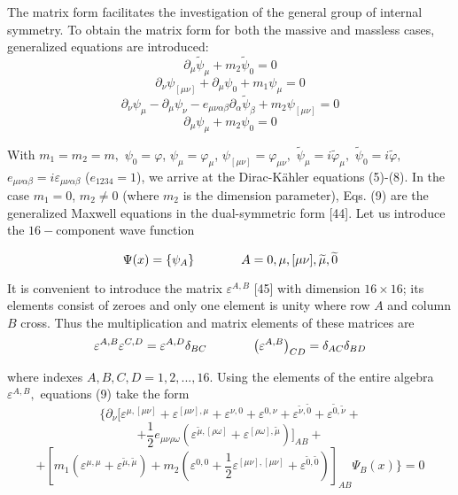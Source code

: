 \documentclass[a4paper,12pt]{article}
\begin{document}
The matrix form facilitates the investigation of the general group of
internal symmetry. To obtain the matrix form for both the massive and
massless cases, generalized equations are introduced:
\[
\partial _\mu \widetilde{\psi }_\mu +m_2\widetilde{\psi }_0=0
\]
\[
\partial _\nu \psi _{[\mu \nu ]}+\partial _\mu \psi _0+m_1\psi _\mu =0
\]
\[
\partial _\nu \psi _\mu -\partial _\mu \psi _\nu -e_{\mu \nu \alpha \beta
}\partial _\alpha \widetilde{\psi }_\beta +m_2\psi _{[\mu \nu ]}=0
\]
\begin{equation}
\partial _\mu \psi _\mu +m_2\psi _0=0  \label{9}
\end{equation}

With $m_1=m_2=m,$ $\psi _0=\varphi $, $\psi _\mu =\varphi _\mu $,
$\psi _{[\mu \nu ]}=\varphi _{\mu \nu },$ $\widetilde{\psi }_\mu
=i\widetilde{ \varphi }_\mu ,$ $\widetilde{\psi
}_0=i\widetilde{\varphi },$ $e_{\mu \nu \alpha \beta
}=i\varepsilon _{\mu \nu \alpha \beta }$ ($e_{1234}=1$), we arrive
at the Dirac-K\"ahler equations (5)-(8). In the case $m_1=0$, $
m_2\neq 0$ (where $m_2$ is the dimension parameter), Eqs. (9) are
the generalized Maxwell equations in the dual-symmetric form [44].
Let us introduce the $16-$component wave function

\begin{equation}
\Psi (x)=\left\{ \psi _A\right\} \hspace{0.5in}A=0,\mu ,[\mu \nu
],\widetilde{\mu },\widetilde{0} \label{10}
\end{equation}

It is convenient to introduce the matrix $\varepsilon ^{A,B}$ [45] with
dimension $16\times 16$; its elements consist of zeroes and only one element
is unity where row $A$ and column $B$ cross. Thus the multiplication and
matrix elements of these matrices are
\begin{equation}
\varepsilon ^{A,B}\varepsilon ^{C,D}=\varepsilon ^{A,D}\delta
_{BC} \hspace{0.5in}\left( \varepsilon ^{A,B}\right) _{CD}=\delta
_{AC}\delta _{BD} \label{11}
\end{equation}

where indexes $A,B,C,D=1,2,...,16$. Using the elements of the entire algebra
$\varepsilon ^{A,B},$ equations (9) take the form
\[
\biggl \{\partial _\nu \biggl [\varepsilon ^{\mu ,[\mu \nu
]}+\varepsilon ^{[\mu \nu ],\mu }+\varepsilon ^{\nu
,0}+\varepsilon ^{0,\nu }+\varepsilon ^{ \widetilde{\nu
},\widetilde{0}}+\varepsilon ^{\widetilde{0},\widetilde{\nu } }+
\]
\[
+\frac 12e_{\mu \nu \rho \omega }\left( \varepsilon
^{\widetilde{\mu },[\rho \omega ]}+\varepsilon ^{[\rho \omega
],\widetilde{\mu }}\right) \biggr ] _{AB}+
\]
\begin{equation}
+\left[ m_1\left( \varepsilon ^{\mu ,\mu }+\varepsilon
^{\widetilde{\mu }, \widetilde{\mu }}\right) +m_2\left(
\varepsilon ^{0,0}+\frac 12\varepsilon ^{[\mu \nu ],[\mu \nu
]}+\varepsilon ^{\widetilde{0},\widetilde{0}}\right) \right]
_{AB}\Psi _B(x)\biggr \}=0  \label{12}
\end{equation}
\end{document}

